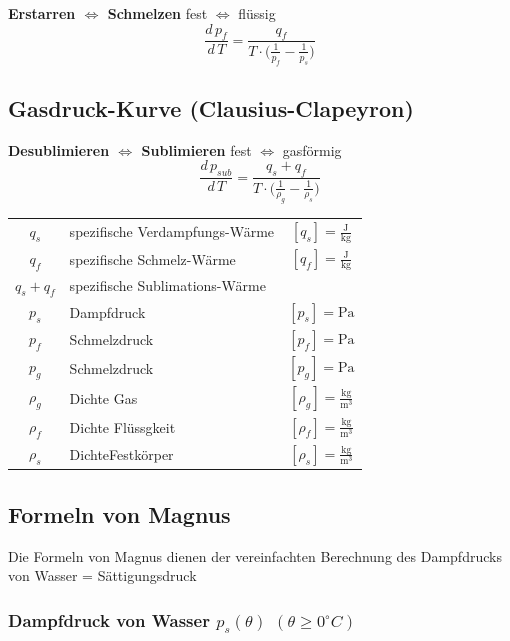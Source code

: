 \textbf{Erstarren $\Leftrightarrow$ Schmelzen}  \qquad fest $\Leftrightarrow$ flüssig \\

$$ \boxed{ \frac{d \, p_f}{d\, T} = \frac{q_f}{T \cdot  \Big( \frac{1}{p_f} - \frac{1}{p_s} \Big)  }     } $$




\subsection{Gasdruck-Kurve (Clausius-Clapeyron)}

\textbf{Desublimieren $\Leftrightarrow$ Sublimieren} \qquad fest $\Leftrightarrow$ gasförmig \\

$$ \boxed{ \frac{d \, p_{sub}}{d\, T} = \frac{q_s + q_f}{T \cdot  \Big( \frac{1}{\rho_g} - \frac{1}{\rho_s} \Big)  }     } $$



\begin{tabular}{c l c}
	\rule{0pt}{10pt}$q_s$ & spezifische Verdampfungs-Wärme & $[q_s] = \mathrm{\frac{J}{kg}}$ \\
	\rule{0pt}{10pt}$q_f$ & spezifische Schmelz-Wärme & $[q_f] = \mathrm{\frac{J}{kg}}$ \\
	$q_s + q_f$ & spezifische Sublimations-Wärme & \\
	$p_s$ & Dampfdruck & $[p_s] = \mathrm{Pa}$ \\
	$p_f$ & Schmelzdruck & $[p_f] = \mathrm{Pa}$ \\
	$p_g$ & Schmelzdruck & $[p_g] = \mathrm{Pa}$ \\
	\rule{0pt}{10pt}$\rho_g$ & Dichte Gas & $[\rho_g] = \mathrm{\frac{kg}{m^3}}$ \\
	\rule{0pt}{10pt}$\rho_f$ & Dichte Flüssgkeit & $[\rho_f] = \mathrm{\frac{kg}{m^3}}$ \\
	\rule{0pt}{10pt}$\rho_s$ & DichteFestkörper & $[\rho_s] = \mathrm{\frac{kg}{m^3}}$ \\
\end{tabular}


\vfill\null
\columnbreak



\subsection{Formeln von Magnus}
Die Formeln von Magnus dienen der vereinfachten Berechnung des Dampfdrucks von Wasser = Sättigungsdruck 

\subsubsection{Dampfdruck von Wasser $p_s(\theta)$ $(\theta \geq 0 ^{\circ}C)$}


